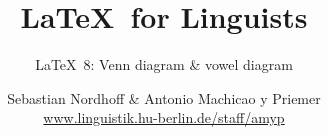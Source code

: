 


\title{
	\LaTeX\ for Linguists
}

\subtitle{\LaTeX\ 8: Venn diagram \& vowel diagram}

\author[aMyP]{
	{\small Sebastian Nordhoff \& Antonio Machicao y Priemer}
	\\
	{\footnotesize \url{www.linguistik.hu-berlin.de/staff/amyp}}
}








\begin{frame}
  \HUtitle
\end{frame}





\nocite{Freitag&MyP15a}
\nocite{Knuth1986}
\nocite{Kopka94a}
	


%
%
%
%
%


